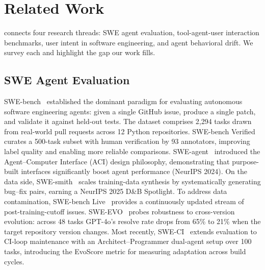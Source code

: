 \section{Related Work}
\label{sec:related}

\bench{} connects four research threads: SWE agent evaluation, tool-agent-user interaction benchmarks, user intent in software engineering, and agent behavioral drift. We survey each and highlight the gap our work fills.

\subsection{SWE Agent Evaluation}
\label{sec:rw-swe}

SWE-bench~\citep{jimenez2024swebench} established the dominant paradigm for evaluating autonomous software engineering agents: given a single GitHub issue, produce a single patch, and validate it against held-out tests. The dataset comprises 2{,}294 tasks drawn from real-world pull requests across 12 Python repositories. SWE-bench Verified curates a 500-task subset with human verification by 93 annotators, improving label quality and enabling more reliable comparisons. SWE-agent~\citep{yang2024sweagent} introduced the Agent--Computer Interface (ACI) design philosophy, demonstrating that purpose-built interfaces significantly boost agent performance (NeurIPS 2024). On the data side, SWE-smith~\citep{swesmith2025} scales training-data synthesis by systematically generating bug--fix pairs, earning a NeurIPS 2025 D\&B Spotlight. To address data contamination, SWE-bench Live~\citep{swebenchlive2025} provides a continuously updated stream of post-training-cutoff issues. SWE-EVO~\citep{sweevo2025} probes robustness to cross-version evolution: across 48 tasks GPT-4o's resolve rate drops from 65\% to 21\% when the target repository version changes. Most recently, SWE-CI~\citep{sweci2026} extends evaluation to CI-loop maintenance with an Architect--Programmer dual-agent setup over 100 tasks, introducing the EvoScore metric for measuring adaptation across build cycles.

